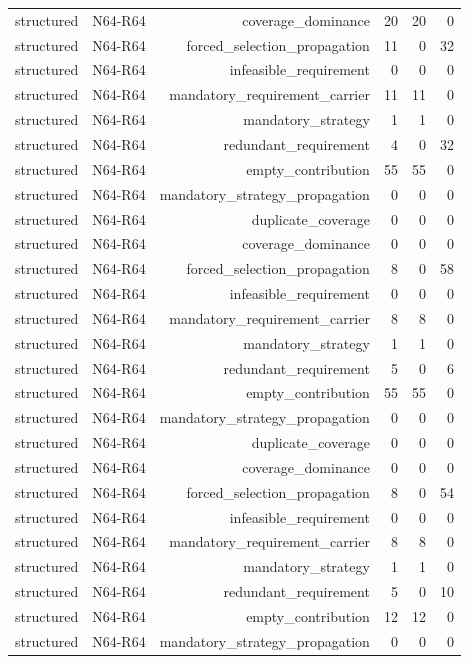 {\begin{longtable}{lrrrrr}
structured & N64-R64 & coverage\_dominance & 20 & 20 & 0 \\
structured & N64-R64 & forced\_selection\_propagation & 11 & 0 & 32 \\
structured & N64-R64 & infeasible\_requirement & 0 & 0 & 0 \\
structured & N64-R64 & mandatory\_requirement\_carrier & 11 & 11 & 0 \\
structured & N64-R64 & mandatory\_strategy & 1 & 1 & 0 \\
structured & N64-R64 & redundant\_requirement & 4 & 0 & 32 \\
structured & N64-R64 & empty\_contribution & 55 & 55 & 0 \\
structured & N64-R64 & mandatory\_strategy\_propagation & 0 & 0 & 0 \\
structured & N64-R64 & duplicate\_coverage & 0 & 0 & 0 \\
structured & N64-R64 & coverage\_dominance & 0 & 0 & 0 \\
structured & N64-R64 & forced\_selection\_propagation & 8 & 0 & 58 \\
structured & N64-R64 & infeasible\_requirement & 0 & 0 & 0 \\
structured & N64-R64 & mandatory\_requirement\_carrier & 8 & 8 & 0 \\
structured & N64-R64 & mandatory\_strategy & 1 & 1 & 0 \\
structured & N64-R64 & redundant\_requirement & 5 & 0 & 6 \\
structured & N64-R64 & empty\_contribution & 55 & 55 & 0 \\
structured & N64-R64 & mandatory\_strategy\_propagation & 0 & 0 & 0 \\
structured & N64-R64 & duplicate\_coverage & 0 & 0 & 0 \\
structured & N64-R64 & coverage\_dominance & 0 & 0 & 0 \\
structured & N64-R64 & forced\_selection\_propagation & 8 & 0 & 54 \\
structured & N64-R64 & infeasible\_requirement & 0 & 0 & 0 \\
structured & N64-R64 & mandatory\_requirement\_carrier & 8 & 8 & 0 \\
structured & N64-R64 & mandatory\_strategy & 1 & 1 & 0 \\
structured & N64-R64 & redundant\_requirement & 5 & 0 & 10 \\
structured & N64-R64 & empty\_contribution & 12 & 12 & 0 \\
structured & N64-R64 & mandatory\_strategy\_propagation & 0 & 0 & 0 \\

\end{longtable}}
